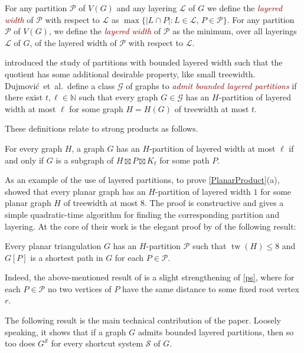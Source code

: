 \documentclass{patmorin}
\newcommand{\defin}[1]{\textcolor{Maroon}{\emph{#1}}}
\DeclareMathOperator{\tw}{tw}
\renewcommand{\SS}{\mathcal{S}}
\renewcommand{\leq}{\leqslant}
\begin{document}
For any partition $\mathcal{P}$ of $V(G)$ and any layering $\mathcal{L}$ of $G$ we define the \defin{layered width} of $\mathcal{P}$ with respect to $\mathcal{L}$ as $\max\{|L\cap P|: L\in\mathcal{L},\, P\in\mathcal{P}\}$.  For any partition $\mathcal{P}$ of $V(G)$, we define the \defin{layered width} of $\mathcal{P}$ as the minimum, over all layerings $\mathcal{L}$ of $G$, of the layered width of $\mathcal{P}$ with respect to $\mathcal{L}$.

\citet{DJMMUW20} introduced the study of partitions with bounded layered width such that the quotient has some additional desirable property, like small treewidth. Dujmovi\'c~et~al.\ define a class $\mathcal{G}$ of graphs to \defin{admit bounded layered partitions} if there exist $t,\ell\in\mathbb{N}$ such that every graph $G\in \mathcal{G}$ has an $H$-partition of layered width at most $\ell$ for some graph $H=H(G)$ of treewidth at most $t$.

These definitions relate to strong products as follows.

\begin{lem}
\label{PartitionProduct}
For every graph $H$, a graph $G$ has an $H$-partition of layered width at most $\ell$ if and only if $G$ is a subgraph of $H \boxtimes P \boxtimes K_\ell$ for some path $P$.
\end{lem}

As an example of the use of layered partitions, to prove \cref{PlanarProduct}(a),
\citet{DJMMUW20} showed that every planar graph has an $H$-partition of layered width $1$ for some planar graph $H$ of treewidth at most $8$. The proof is constructive and gives a simple quadratic-time algorithm for finding the corresponding partition and layering.
At the core of their work is the elegant proof by \citet{PS21} of the following result:

\begin{thm}[\citep{PS21}]
\label{ps}
Every planar triangulation $G$ has an $H$-partition $\mathcal{P}$
such that $\tw(H)\leq 8$ and $G[P]$ is a shortest path in $G$ for each $P\in\mathcal{P}$.
\end{thm}

Indeed, the above-mentioned result of \citet{DJMMUW20} is a slight strengthening of \cref{ps}, where for each $P\in\mathcal{P}$ no two vertices of $P$ have the same distance to some fixed root vertex $r$.

The following result is the main technical contribution of the paper. Loosely speaking, it shows that if a graph $G$ admits bounded layered partitions, then so too does $G^\SS$ for every shortcut system $\SS$ of $G$.
\end{document}
